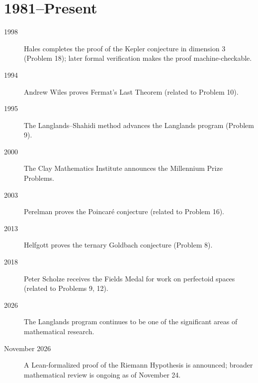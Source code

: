 \section*{1981--Present}

\begin{description}
    \item[1998] Hales completes the proof of the Kepler conjecture in dimension 3 (Problem 18); later formal verification makes the proof machine-checkable.
    \item[1994] Andrew Wiles proves Fermat's Last Theorem (related to Problem 10).
    \item[1995] The Langlands--Shahidi method advances the Langlands program (Problem 9).
    \item[2000] The Clay Mathematics Institute announces the Millennium Prize Problems.
    \item[2003] Perelman proves the Poincar\'e conjecture (related to Problem 16).
    \item[2013] Helfgott proves the ternary Goldbach conjecture (Problem 8).
    \item[2018] Peter Scholze receives the Fields Medal for work on perfectoid spaces (related to Problems 9, 12).
    \item[2026] The Langlands program continues to be one of the significant areas of mathematical research.
    \item[November 2026] A Lean-formalized proof of the Riemann Hypothesis is announced; broader mathematical review is ongoing as of November 24.
\end{description}
